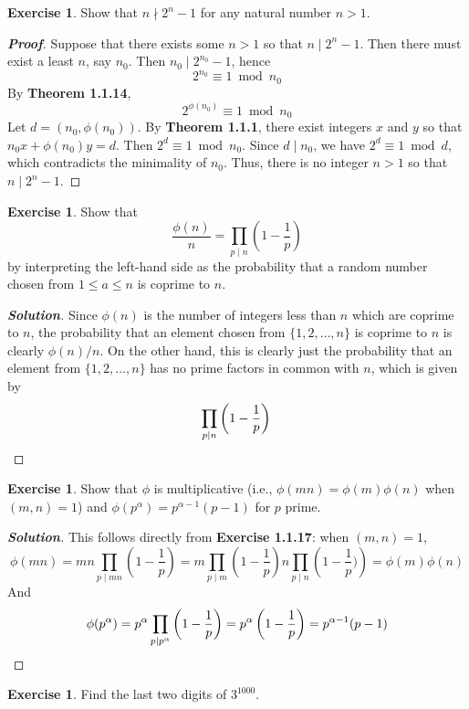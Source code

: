 \documentclass[12pt,leqno]{book}
\numberwithin{equation}{section}
\theoremstyle{definition}
\newtheorem{exer}[thm]{Exercise}
\newenvironment{Proof}{\begin{proof}[\textnormal{\textbf{Proof}}]}{\end{proof}}
\newenvironment{Solution}{\begin{proof}[\textnormal{\textbf{Solution}}]}{\end{proof}}
\begin{document}
\begin{exer}
 Show that $n\nmid2^n-1$ for any natural number $n>1$. 
\end{exer}

\begin{Proof}
 Suppose that there exists some $n>1$ so that $n\mid 2^n-1$. Then there must exist a least $n$, say $n_0$. Then $n_0\mid2^{n_0}-1$, hence \[2^{n_0}\equiv1\bmod{n_0}\] By \textbf{Theorem 1.1.14}, \[2^{\phi(n_0)}\equiv1\bmod{n_0}\] Let $d=(n_0,\phi(n_0))$. By \textbf{Theorem 1.1.1}, there exist integers $x$ and $y$ so that $n_0x+\phi(n_0)y=d$. Then $2^d\equiv1\bmod{n_0}$. Since $d\mid n_0$, we have $2^d\equiv1\bmod{d}$, which contradicts the minimality of $n_0$. Thus, there is no integer $n>1$ so that $n\mid2^n-1$.
\end{Proof}

\begin{exer}
 Show that \[\frac{\phi(n)}{n}=\prod_{p\mid n}\left(1-\frac{1}{p}\right)\] by interpreting the left-hand side as the probability that a random number chosen from $1\leq a\leq n$ is coprime to $n$.
\end{exer}

\begin{Solution}
 Since $\phi(n)$ is the number of integers less than $n$ which are coprime to $n$, the probability that an element chosen from $\{1,2,\hdots,n\}$ is coprime to $n$ is clearly $\phi(n)/n$. On the other hand, this is clearly just the probability that an element from $\{1,2,\hdots,n\}$ has no prime factors in common with $n$, which is given by \[\prod_{p\mid n}\left(1-\frac{1}{p}\right)\qedhere\]
\end{Solution}

\begin{exer}
 Show that $\phi$ is multiplicative (i.e., $\phi(mn)=\phi(m)\phi(n)$ when $(m,n)=1$) and $\phi(p^{\alpha})=p^{\alpha-1}(p-1)$ for $p$ prime.
\end{exer}

\begin{Solution}
 This follows directly from \textbf{Exercise 1.1.17}: when $(m,n)=1$, \[\phi(mn)=mn\prod_{p\mid mn}\left(1-\frac{1}{p}\right)=m\prod_{p\mid m}\left(1-\frac{1}{p}\right)n\prod_{p\mid n}\left(1-\frac{1}{p})\right)=\phi(m)\phi(n)\] And \[\phi(p^{\alpha})=p^{\alpha}\prod_{p\mid p^{\alpha}}\left(1-\frac{1}{p}\right)=p^{\alpha}\left(1-\frac{1}{p}\right)=p^{\alpha-1}(p-1)\qedhere\]
\end{Solution}

\begin{exer}
 Find the last two digits of $3^{1000}$. 
\end{exer}
\end{document}
